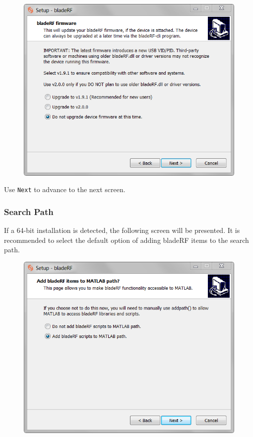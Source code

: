 {\begin{figure}[h]
  \centering
  \includegraphics{images/windows/installer/04-fwupgrade.png}
\end{figure}

Use \texttt{Next} to advance to the next screen.

\newpage
\subsubsection{\matlab Search Path} \label{sec:matlabsearchpath}

If a 64-bit \matlab installation is detected, the following screen will be
presented. It is recommended to select the default option of adding
bladeRF items to the \matlab search path.

\begin{figure}[h]
  \centering
  \includegraphics{images/windows/installer/05-matlabpath.png}
\end{figure}

}

